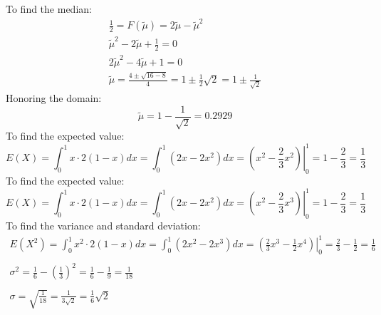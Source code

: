 \documentclass[letterpaper,12pt,fleqn]{article}
\newcommand{\med}{\tilde{\mu}}
\renewcommand{\o}{\sigma}
\begin{document}
\begin{example}
  To find the median:
  \begin{gather*}
    \frac{1}{2}=F(\med)=2\med-\med^2 \\
    \med^2-2\med+\frac{1}{2}=0 \\
    2\med^2-4\med+1=0 \\
    \med=\frac{4\pm\sqrt{16-8}}{4}=1\pm\frac{1}{2}\sqrt{2}=1\pm\frac{1}{\sqrt{2}}
  \end{gather*}
  Honoring the domain:
  \[\med=1-\frac{1}{\sqrt{2}}=0.2929\]
  To find the expected value:
  \[E(X)=\int_0^1x\cdot2(1-x)dx=\int_0^1(2x-2x^2)dx=\left.\left(x^2-\frac{2}{3}x^2\right)\right|_0^1=1-\frac{2}{3}=
  \frac{1}{3}\]
  To find the expected value:
  \[E(X)=\int_0^1x\cdot2(1-x)dx=\int_0^1(2x-2x^2)dx=\left.\left(x^2-\frac{2}{3}x^3\right)\right|_0^1=1-\frac{2}{3}=
  \frac{1}{3}\]
  To find the variance and standard deviation:
  \begin{gather*}
    E(X^2)=\int_0^1x^2\cdot2(1-x)dx=\int_0^1(2x^2-2x^3)dx=\left.\left(\frac{2}{3}x^3-\frac{1}{2}x^4\right)\right|_0^1=
    \frac{2}{3}-\frac{1}{2}=\frac{1}{6} \\
    \\
    \o^2=\frac{1}{6}-\left(\frac{1}{3}\right)^2=\frac{1}{6}-\frac{1}{9}=\frac{1}{18} \\
    \\
    \o=\sqrt{\frac{1}{18}}=\frac{1}{3\sqrt{2}}=\frac{1}{6}\sqrt{2}
  \end{gather*}
\end{example}
\end{document}
